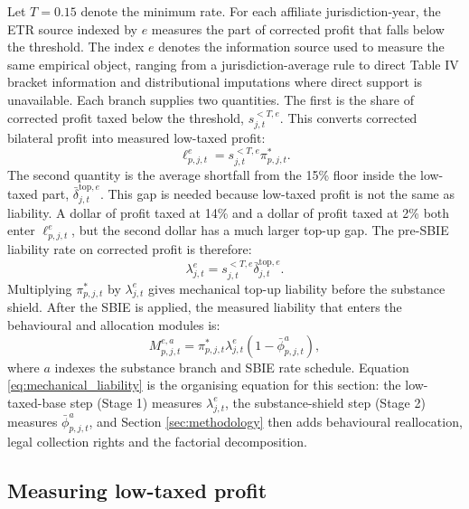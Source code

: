 \documentclass[11pt,a4paper]{article}
\begin{document}
Let $T=0.15$ denote the minimum rate. For each affiliate jurisdiction-year, the ETR source indexed by $e$ measures the part of corrected profit that falls below the threshold. The index $e$ denotes the information source used to measure the same empirical object, ranging from a jurisdiction-average rule to direct Table IV bracket information and distributional imputations where direct support is unavailable. Each branch supplies two quantities. The first is the share of corrected profit taxed below the threshold, $s_{j,t}^{<T,e}$. This converts corrected bilateral profit into measured low-taxed profit:
\begin{equation}\label{eq:lowtax_profit}
\ell_{p,j,t}^{e}=s_{j,t}^{<T,e}\pi^{*}_{p,j,t}.
\end{equation}
The second quantity is the average shortfall from the 15\% floor inside the low-taxed part, $\bar{\delta}_{j,t}^{\text{top},e}$. This gap is needed because low-taxed profit is not the same as liability. A dollar of profit taxed at 14\% and a dollar of profit taxed at 2\% both enter $\ell_{p,j,t}^{e}$, but the second dollar has a much larger top-up gap. The pre-SBIE liability rate on corrected profit is therefore:
\begin{equation}\label{eq:liability_rate}
\lambda_{j,t}^{e}=s_{j,t}^{<T,e}\bar{\delta}_{j,t}^{\text{top},e}.
\end{equation}
Multiplying $\pi^{*}_{p,j,t}$ by $\lambda_{j,t}^{e}$ gives mechanical top-up liability before the substance shield. After the SBIE is applied, the measured liability that enters the behavioural and allocation modules is:
\begin{equation}\label{eq:mechanical_liability}
M_{p,j,t}^{e,a}=\pi^{*}_{p,j,t}\lambda_{j,t}^{e}\left(1-\bar{\phi}_{p,j,t}^{a}\right),
\end{equation}
where $a$ indexes the substance branch and SBIE rate schedule. Equation \eqref{eq:mechanical_liability} is the organising equation for this section: the low-taxed-base step (Stage 1) measures $\lambda_{j,t}^{e}$, the substance-shield step (Stage 2) measures $\bar{\phi}_{p,j,t}^{a}$, and Section \ref{sec:methodology} then adds behavioural reallocation, legal collection rights and the factorial decomposition.

\subsection{Measuring low-taxed profit}\label{sec:etr_measurement}\label{sec:etr_calc}\label{sec:distributional}
\end{document}
